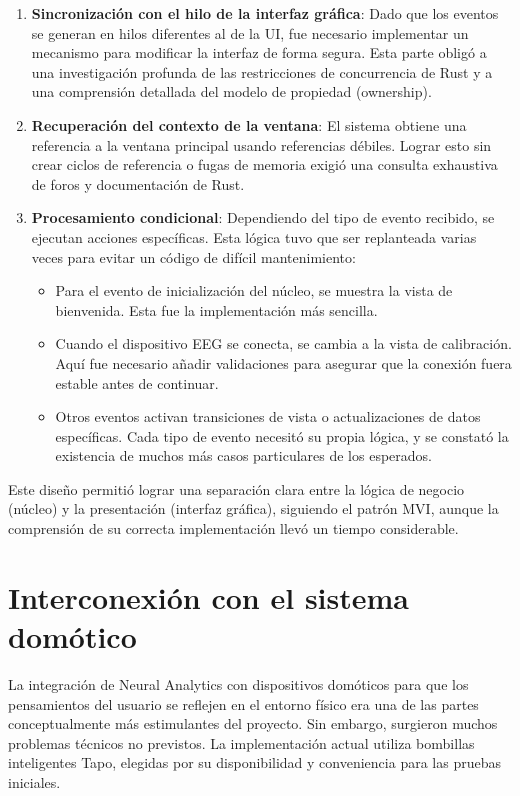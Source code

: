 \begin{enumerate}
\begin{enumerate}
    \item \textbf{Sincronización con el hilo de la interfaz gráfica}: Dado que los eventos se generan en hilos diferentes al de la UI, fue necesario implementar un mecanismo para modificar la interfaz de forma segura. Esta parte obligó a una investigación profunda de las restricciones de concurrencia de Rust y a una comprensión detallada del modelo de propiedad (ownership).
    
    \item \textbf{Recuperación del contexto de la ventana}: El sistema obtiene una referencia a la ventana principal usando referencias débiles. Lograr esto sin crear ciclos de referencia o fugas de memoria exigió una consulta exhaustiva de foros y documentación de Rust.
    
    \item \textbf{Procesamiento condicional}: Dependiendo del tipo de evento recibido, se ejecutan acciones específicas. Esta lógica tuvo que ser replanteada varias veces para evitar un código de difícil mantenimiento:
    \begin{itemize}
        \item Para el evento de inicialización del núcleo, se muestra la vista de bienvenida. Esta fue la implementación más sencilla.
        \item Cuando el dispositivo EEG se conecta, se cambia a la vista de calibración. Aquí fue necesario añadir validaciones para asegurar que la conexión fuera estable antes de continuar.
        \item Otros eventos activan transiciones de vista o actualizaciones de datos específicas. Cada tipo de evento necesitó su propia lógica, y se constató la existencia de muchos más casos particulares de los esperados.
    \end{itemize}
\end{enumerate}

Este diseño permitió lograr una separación clara entre la lógica de negocio (núcleo) y la presentación (interfaz gráfica), siguiendo el patrón MVI, aunque la comprensión de su correcta implementación llevó un tiempo considerable.

\section{Interconexión con el sistema domótico}

La integración de Neural Analytics con dispositivos domóticos para que los pensamientos del usuario se reflejen en el entorno físico era una de las partes conceptualmente más estimulantes del proyecto. Sin embargo, surgieron muchos problemas técnicos no previstos. La implementación actual utiliza bombillas inteligentes Tapo, elegidas por su disponibilidad y conveniencia para las pruebas iniciales.


\end{enumerate}
